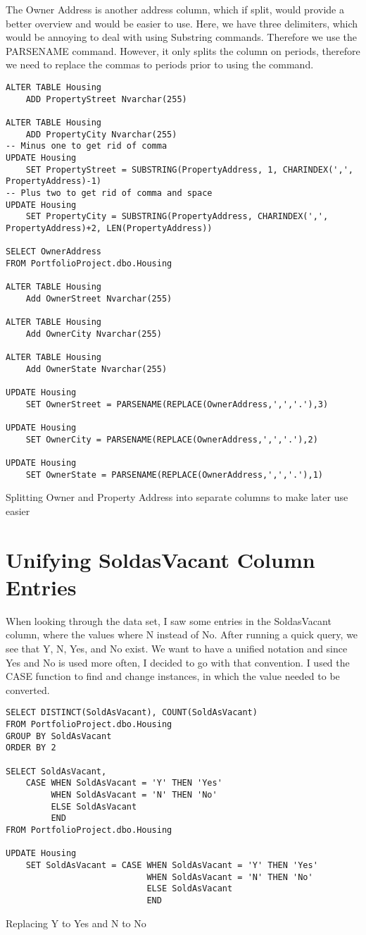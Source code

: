 \documentclass[11pt]{article}
\begin{document}
The Owner Address is another address column, which if split, would provide a better overview and would be easier to use.
Here, we have three delimiters, which would be annoying to deal with using Substring commands. Therefore we use the PARSENAME command.
However, it only splits the column on periods, therefore we need to replace the commas to periods prior to using the command.
\begin{lstlisting}
ALTER TABLE Housing
	ADD PropertyStreet Nvarchar(255)

ALTER TABLE Housing
	ADD PropertyCity Nvarchar(255)
-- Minus one to get rid of comma
UPDATE Housing
	SET PropertyStreet = SUBSTRING(PropertyAddress, 1, CHARINDEX(',', PropertyAddress)-1)
-- Plus two to get rid of comma and space
UPDATE Housing
	SET PropertyCity = SUBSTRING(PropertyAddress, CHARINDEX(',', PropertyAddress)+2, LEN(PropertyAddress))
	
SELECT OwnerAddress
FROM PortfolioProject.dbo.Housing

ALTER TABLE Housing
	Add OwnerStreet Nvarchar(255)

ALTER TABLE Housing
	Add OwnerCity Nvarchar(255)

ALTER TABLE Housing
	Add OwnerState Nvarchar(255)

UPDATE Housing
	SET OwnerStreet = PARSENAME(REPLACE(OwnerAddress,',','.'),3)

UPDATE Housing
	SET OwnerCity = PARSENAME(REPLACE(OwnerAddress,',','.'),2)

UPDATE Housing
	SET OwnerState = PARSENAME(REPLACE(OwnerAddress,',','.'),1)
\end{lstlisting}
\caption{Splitting Owner and Property Address into separate columns to make later use easier}

\section{Unifying SoldasVacant Column Entries}
When looking through the data set, I saw some entries in the SoldasVacant column, where the values where N instead of No.
After running a quick query, we see that Y, N, Yes, and No exist. We want to have a unified notation and since Yes and No is used more often, I decided to go with that convention.
I used the CASE function to find and change instances, in which the value needed to be converted.

\begin{lstlisting}
SELECT DISTINCT(SoldAsVacant), COUNT(SoldAsVacant)
FROM PortfolioProject.dbo.Housing
GROUP BY SoldAsVacant
ORDER BY 2

SELECT SoldAsVacant,	
	CASE WHEN SoldAsVacant = 'Y' THEN 'Yes'
		 WHEN SoldAsVacant = 'N' THEN 'No'
		 ELSE SoldAsVacant
		 END
FROM PortfolioProject.dbo.Housing

UPDATE Housing
	SET SoldAsVacant = CASE WHEN SoldAsVacant = 'Y' THEN 'Yes'
							WHEN SoldAsVacant = 'N' THEN 'No'
							ELSE SoldAsVacant
							END
\end{lstlisting}
\caption{Replacing Y to Yes and N to No}
\end{document}

